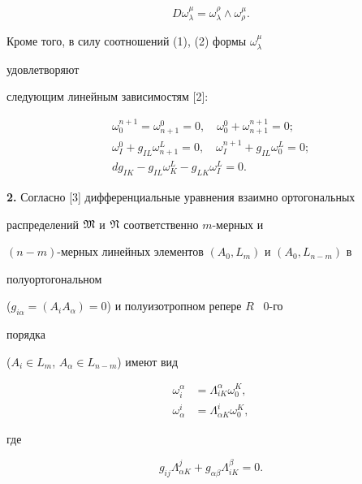 $$ 


D\omega^\mu_\lambda=\omega^\rho_\lambda\wedge\omega^\mu_\rho. 


$$ 


Кроме того, в силу соотношений (1), (2) формы $\omega^\mu_\lambda$ 


удовлетворяют 


следующим линейным зависимостям [2]: 


\begin{gather*} 


\omega^{n+1}_0=\omega^0_{n+1}=0,\quad 


\omega^0_0+\omega^{n+1}_{n+1}=0; \\ 


\omega^0_I+g_{I L}\omega^L_{n+1}=0,\quad 


\omega^{n+1}_I+g_{I L}\omega^L_0=0;\\ 


d g_{I K}-g_{I L}\omega^L_K-g_{L K}\omega^L_I=0. 


\end{gather*} 


 


{\bf 2.} Согласно [3] дифференциальные уравнения взаимно ортогональных 


распределений $\frak M$ и $\frak N$ соответственно $m$-мерных и 


$(n-m)$-мерных линейных элементов $(A_0,L_m)$ и $(A_0,L_{n-m})$ в 


полуортогональном 


($g_{i\alpha}=(A_i A_\alpha)=0$) и полуизотропном репере $R$ \ 0-го 


порядка 


($A_i\in L_m$, $A_\alpha\in L_{n-m}$) имеют вид 


\begin{align} 


\omega^\alpha_i&=\Lambda^\alpha_{i K}\omega^K_0,\\ 


\omega^i_\alpha&=\Lambda^i_{\alpha K}\omega^K_0, 


\end{align} 


где 


\begin{equation} 


g_{i j}\Lambda^j_{\alpha K}+g_{\alpha\beta} 


\Lambda^\beta_{i K}=0. 


\end{equation} 


